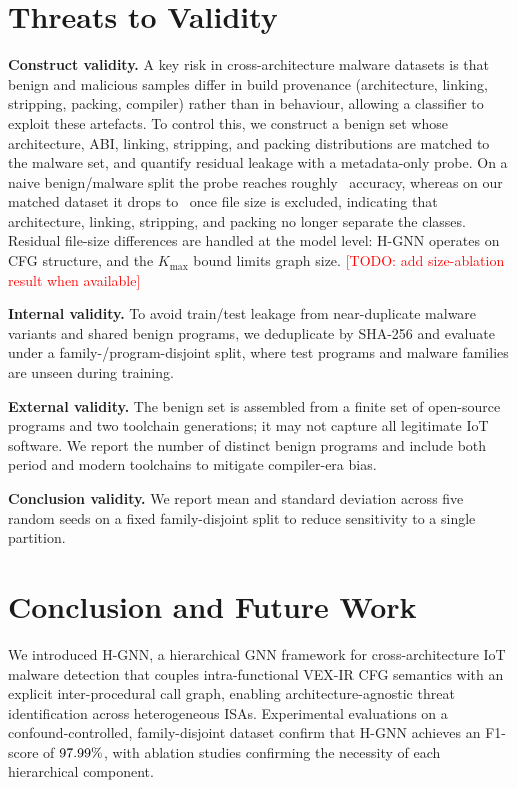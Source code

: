 \documentclass{llncs}
\newcommand{\method}{H-GNN}
\begin{document}
\section{Threats to Validity}
\label{sec:threats}

\textbf{Construct validity.} A key risk in cross-architecture malware datasets is that benign and
malicious samples differ in build provenance (architecture, linking, stripping, packing, compiler)
rather than in behaviour, allowing a classifier to exploit these artefacts. To control this, we
construct a benign set whose architecture, ABI, linking, stripping, and packing distributions are
matched to the malware set, and quantify residual leakage with a metadata-only probe. On a naive
benign/malware split the probe reaches roughly \hgnnProbeOld\ accuracy, whereas on our matched dataset
it drops to \hgnnProbeNoSize\ once file size is excluded, indicating that architecture, linking,
stripping, and packing no longer separate the classes. Residual file-size differences are handled at
the model level: H-GNN operates on CFG structure, and the $K_{\max}$ bound limits graph size.
\textcolor{red}{[TODO: add size-ablation result when available]}

\textbf{Internal validity.} To avoid train/test leakage from near-duplicate malware variants and
shared benign programs, we deduplicate by SHA-256 and evaluate under a family-/program-disjoint split,
where test programs and malware families are unseen during training.

\textbf{External validity.} The benign set is assembled from a finite set of open-source programs and
two toolchain generations; it may not capture all legitimate IoT software. We report the number of
distinct benign programs and include both period and modern toolchains to mitigate compiler-era bias.

\textbf{Conclusion validity.} We report mean and standard deviation across five random seeds on a
fixed family-disjoint split to reduce sensitivity to a single partition.

\section{Conclusion and Future Work}
\label{sec:conclusion}

We introduced \method{}, a hierarchical GNN framework for cross-architecture
IoT malware detection that couples intra-functional VEX-IR CFG semantics
with an explicit inter-procedural call graph, enabling architecture-agnostic
threat identification across heterogeneous ISAs.
Experimental evaluations on a confound-controlled, family-disjoint
dataset confirm that \method{} achieves an F1-score of $97.99\%$, with
ablation studies confirming the necessity of each hierarchical component.
\end{document}
